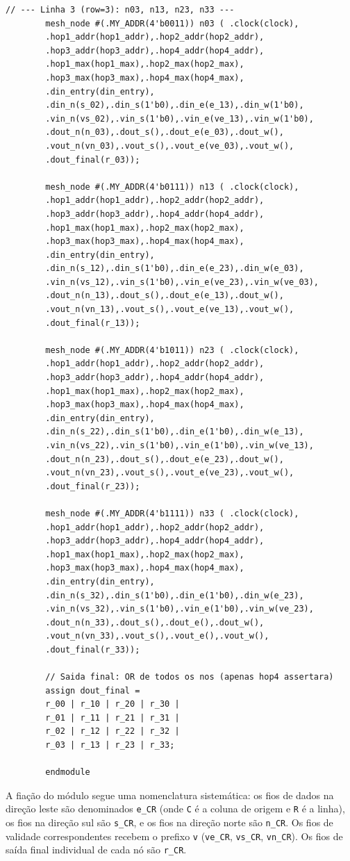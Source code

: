 \documentclass[12pt, a4paper]{article}
\begin{document}
\begin{lstlisting}[style=verilog, caption={\texttt{mesh\_4x4.v} --- Estrutura de interligação dos 16 nós da rede \textit{mesh} 4$\times$4, com fiação completa de dados e sinais de validade.}, label={lst:mesh4x4}]
		// --- Linha 3 (row=3): n03, n13, n23, n33 ---
		mesh_node #(.MY_ADDR(4'b0011)) n03 ( .clock(clock),
		.hop1_addr(hop1_addr),.hop2_addr(hop2_addr),
		.hop3_addr(hop3_addr),.hop4_addr(hop4_addr),
		.hop1_max(hop1_max),.hop2_max(hop2_max),
		.hop3_max(hop3_max),.hop4_max(hop4_max),
		.din_entry(din_entry),
		.din_n(s_02),.din_s(1'b0),.din_e(e_13),.din_w(1'b0),
		.vin_n(vs_02),.vin_s(1'b0),.vin_e(ve_13),.vin_w(1'b0),
		.dout_n(n_03),.dout_s(),.dout_e(e_03),.dout_w(),
		.vout_n(vn_03),.vout_s(),.vout_e(ve_03),.vout_w(),
		.dout_final(r_03));
		
		mesh_node #(.MY_ADDR(4'b0111)) n13 ( .clock(clock),
		.hop1_addr(hop1_addr),.hop2_addr(hop2_addr),
		.hop3_addr(hop3_addr),.hop4_addr(hop4_addr),
		.hop1_max(hop1_max),.hop2_max(hop2_max),
		.hop3_max(hop3_max),.hop4_max(hop4_max),
		.din_entry(din_entry),
		.din_n(s_12),.din_s(1'b0),.din_e(e_23),.din_w(e_03),
		.vin_n(vs_12),.vin_s(1'b0),.vin_e(ve_23),.vin_w(ve_03),
		.dout_n(n_13),.dout_s(),.dout_e(e_13),.dout_w(),
		.vout_n(vn_13),.vout_s(),.vout_e(ve_13),.vout_w(),
		.dout_final(r_13));
		
		mesh_node #(.MY_ADDR(4'b1011)) n23 ( .clock(clock),
		.hop1_addr(hop1_addr),.hop2_addr(hop2_addr),
		.hop3_addr(hop3_addr),.hop4_addr(hop4_addr),
		.hop1_max(hop1_max),.hop2_max(hop2_max),
		.hop3_max(hop3_max),.hop4_max(hop4_max),
		.din_entry(din_entry),
		.din_n(s_22),.din_s(1'b0),.din_e(1'b0),.din_w(e_13),
		.vin_n(vs_22),.vin_s(1'b0),.vin_e(1'b0),.vin_w(ve_13),
		.dout_n(n_23),.dout_s(),.dout_e(e_23),.dout_w(),
		.vout_n(vn_23),.vout_s(),.vout_e(ve_23),.vout_w(),
		.dout_final(r_23));
		
		mesh_node #(.MY_ADDR(4'b1111)) n33 ( .clock(clock),
		.hop1_addr(hop1_addr),.hop2_addr(hop2_addr),
		.hop3_addr(hop3_addr),.hop4_addr(hop4_addr),
		.hop1_max(hop1_max),.hop2_max(hop2_max),
		.hop3_max(hop3_max),.hop4_max(hop4_max),
		.din_entry(din_entry),
		.din_n(s_32),.din_s(1'b0),.din_e(1'b0),.din_w(e_23),
		.vin_n(vs_32),.vin_s(1'b0),.vin_e(1'b0),.vin_w(ve_23),
		.dout_n(n_33),.dout_s(),.dout_e(),.dout_w(),
		.vout_n(vn_33),.vout_s(),.vout_e(),.vout_w(),
		.dout_final(r_33));
		
		// Saida final: OR de todos os nos (apenas hop4 assertara)
		assign dout_final =
		r_00 | r_10 | r_20 | r_30 |
		r_01 | r_11 | r_21 | r_31 |
		r_02 | r_12 | r_22 | r_32 |
		r_03 | r_13 | r_23 | r_33;
		
		endmodule
	\end{lstlisting}
	
	A fiação do módulo segue uma nomenclatura sistemática: os fios de dados na
	direção leste são denominados \texttt{e\_CR} (onde \texttt{C} é a coluna de
	origem e \texttt{R} é a linha), os fios na direção sul são \texttt{s\_CR}, e
	os fios na direção norte são \texttt{n\_CR}. Os fios de validade correspondentes
	recebem o prefixo \texttt{v} (\texttt{ve\_CR}, \texttt{vs\_CR}, \texttt{vn\_CR}).
	Os fios de saída final individual de cada nó são \texttt{r\_CR}.
	
\end{document}
